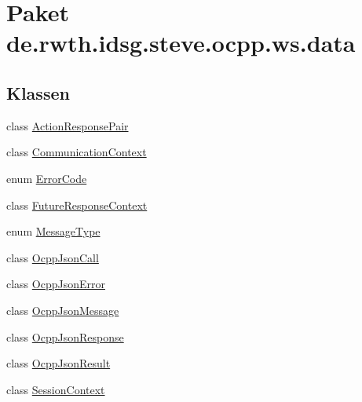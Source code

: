 \hypertarget{namespacede_1_1rwth_1_1idsg_1_1steve_1_1ocpp_1_1ws_1_1data}{\section{Paket de.\+rwth.\+idsg.\+steve.\+ocpp.\+ws.\+data}
\label{namespacede_1_1rwth_1_1idsg_1_1steve_1_1ocpp_1_1ws_1_1data}
}
\subsection*{Klassen}
\begin{DoxyCompactItemize}
\item 
class \hyperlink{classde_1_1rwth_1_1idsg_1_1steve_1_1ocpp_1_1ws_1_1data_1_1_action_response_pair}{Action\+Response\+Pair}
\item 
class \hyperlink{classde_1_1rwth_1_1idsg_1_1steve_1_1ocpp_1_1ws_1_1data_1_1_communication_context}{Communication\+Context}
\item 
enum \hyperlink{enumde_1_1rwth_1_1idsg_1_1steve_1_1ocpp_1_1ws_1_1data_1_1_error_code}{Error\+Code}
\item 
class \hyperlink{classde_1_1rwth_1_1idsg_1_1steve_1_1ocpp_1_1ws_1_1data_1_1_future_response_context}{Future\+Response\+Context}
\item 
enum \hyperlink{enumde_1_1rwth_1_1idsg_1_1steve_1_1ocpp_1_1ws_1_1data_1_1_message_type}{Message\+Type}
\item 
class \hyperlink{classde_1_1rwth_1_1idsg_1_1steve_1_1ocpp_1_1ws_1_1data_1_1_ocpp_json_call}{Ocpp\+Json\+Call}
\item 
class \hyperlink{classde_1_1rwth_1_1idsg_1_1steve_1_1ocpp_1_1ws_1_1data_1_1_ocpp_json_error}{Ocpp\+Json\+Error}
\item 
class \hyperlink{classde_1_1rwth_1_1idsg_1_1steve_1_1ocpp_1_1ws_1_1data_1_1_ocpp_json_message}{Ocpp\+Json\+Message}
\item 
class \hyperlink{classde_1_1rwth_1_1idsg_1_1steve_1_1ocpp_1_1ws_1_1data_1_1_ocpp_json_response}{Ocpp\+Json\+Response}
\item 
class \hyperlink{classde_1_1rwth_1_1idsg_1_1steve_1_1ocpp_1_1ws_1_1data_1_1_ocpp_json_result}{Ocpp\+Json\+Result}
\item 
class \hyperlink{classde_1_1rwth_1_1idsg_1_1steve_1_1ocpp_1_1ws_1_1data_1_1_session_context}{Session\+Context}
\end{DoxyCompactItemize}
